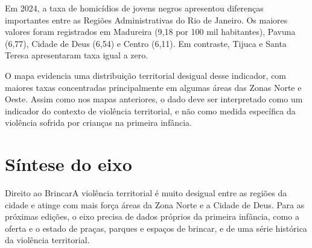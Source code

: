 Em 2024, a taxa de homicídios de jovens negros apresentou diferenças importantes entre as Regiões Administrativas do Rio de Janeiro. Os maiores valores foram registrados em Madureira (9,18 por 100 mil habitantes), Pavuna (6,77), Cidade de Deus (6,54) e Centro (6,11). Em contraste, Tijuca e Santa Teresa apresentaram taxa igual a zero.

O mapa evidencia uma distribuição territorial desigual desse indicador, com maiores taxas concentradas principalmente em algumas áreas das Zonas Norte e Oeste. Assim como nos mapas anteriores, o dado deve ser interpretado como um indicador do contexto de violência territorial, e não como medida específica da violência sofrida por crianças na primeira infância.


\section{Síntese do eixo}

\begin{sintese}{Direito ao Brincar}A violência territorial é muito desigual entre as regiões da cidade e atinge com mais força áreas da Zona Norte e a Cidade de Deus. Para as próximas edições, o eixo precisa de dados próprios da primeira infância, como a oferta e o estado de praças, parques e espaços de brincar, e de uma série histórica da violência territorial.\end{sintese}

